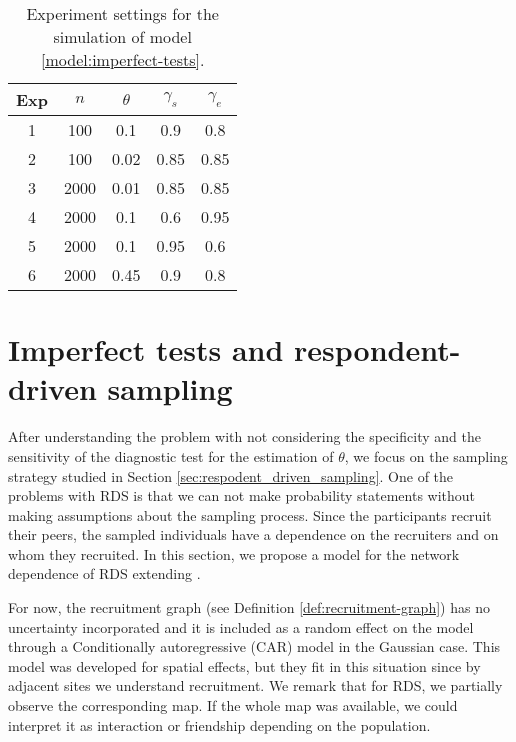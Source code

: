 \begin{table}[!ht]
  \centering
  \caption{\label{table:experiments-imperfect-test}Experiment settings for the
  simulation of model \eqref{model:imperfect-tests}.}
  \begin{tabular}{ccccc}
  \hline
  Exp & $n$ & $\theta$ & $\gamma_s$ & $\gamma_e$ \\ \hline
  \multicolumn{1}{c}{1} & 100 & 0.1 & 0.9 & 0.8 \\
  \multicolumn{1}{c}{2} & 100 & 0.02 & 0.85 & 0.85 \\
  \multicolumn{1}{c}{3} & 2000 & 0.01 & 0.85 & 0.85 \\
  \multicolumn{1}{c}{4} & 2000 & 0.1 & 0.6 & 0.95 \\
  \multicolumn{1}{c}{5} & 2000 & 0.1 & 0.95 & 0.6 \\ 
  \multicolumn{1}{c}{6} & 2000 & 0.45 & 0.9 & 0.8 \\ \hline
  \end{tabular}
\end{table}



\section{Imperfect tests and respondent-driven sampling}

After understanding the problem with not considering the specificity and the
sensitivity of the diagnostic test for the estimation of $\theta$, we focus on the
sampling strategy studied in Section \ref{sec:respodent_driven_sampling}. 
One of the problems with RDS is that we can not make probability statements
without making assumptions about the sampling process. Since the participants
recruit their peers, the sampled individuals have a dependence on the
recruiters and on whom they recruited. In this section, we propose a model for
the network dependence of RDS extending \textcite{bastos2012binary}.

For now, the recruitment graph (see Definition \ref{def:recruitment-graph}) has no
uncertainty incorporated and it is included as a random effect on the model  
through a Conditionally autoregressive (CAR) model in the Gaussian case. This
model was developed for spatial effects, but they fit in this situation since
by adjacent sites we understand recruitment. We remark that for RDS, we
partially observe the corresponding map. If the whole map was available, we
could interpret it as interaction or friendship depending on the population. 



